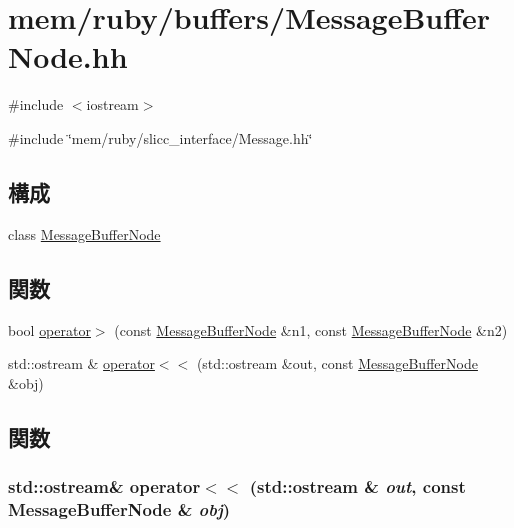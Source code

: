 \hypertarget{MessageBufferNode_8hh}{
\section{mem/ruby/buffers/MessageBufferNode.hh}
\label{MessageBufferNode_8hh}
}
{\ttfamily \#include $<$iostream$>$}\par
{\ttfamily \#include \char`\"{}mem/ruby/slicc\_\-interface/Message.hh\char`\"{}}\par
\subsection*{構成}
\begin{DoxyCompactItemize}
\item 
class \hyperlink{classMessageBufferNode}{MessageBufferNode}
\end{DoxyCompactItemize}
\subsection*{関数}
\begin{DoxyCompactItemize}
\item 
bool \hyperlink{MessageBufferNode_8hh_a903305019990d40c6303646dab4ce7af}{operator$>$} (const \hyperlink{classMessageBufferNode}{MessageBufferNode} \&n1, const \hyperlink{classMessageBufferNode}{MessageBufferNode} \&n2)
\item 
std::ostream \& \hyperlink{MessageBufferNode_8hh_a9262101606b8496f0a0a1a0c4b849417}{operator$<$$<$} (std::ostream \&out, const \hyperlink{classMessageBufferNode}{MessageBufferNode} \&obj)
\end{DoxyCompactItemize}


\subsection{関数}
\hypertarget{MessageBufferNode_8hh_a9262101606b8496f0a0a1a0c4b849417}{
\subsubsection[{operator$<$$<$}]{\setlength{\rightskip}{0pt plus 5cm}std::ostream\& operator$<$$<$ (std::ostream \& {\em out}, \/  const {\bf MessageBufferNode} \& {\em obj})}}
\label{MessageBufferNode_8hh_a9262101606b8496f0a0a1a0c4b849417}



